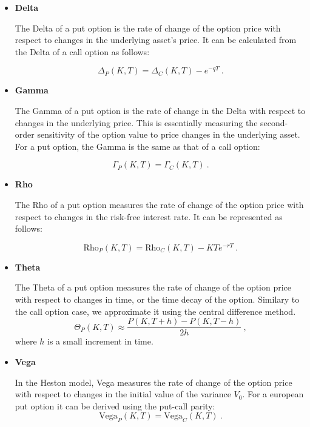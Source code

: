 \begin{itemize}

\item \textbf{Delta} 

The Delta of a put option is the rate of change of the option price with respect to changes in the underlying asset's price. It can be calculated from the Delta of a call option as follows:

$$
\Delta_P(K,T) = \Delta_C(K,T) - e^{-q T} \ .
$$


\item \textbf{Gamma} 

The Gamma of a put option is the rate of change in the Delta with respect to changes in the underlying price. This is essentially measuring the second-order sensitivity of the option value to price changes in the underlying asset. For a put option, the Gamma is the same as that of a call option:

$$
\Gamma_P(K,T) = \Gamma_C(K,T) \ .
$$



\item \textbf{Rho} 

The Rho of a put option measures the rate of change of the option price with respect to changes in the risk-free interest rate. It can be represented as follows:

$$
\text{Rho}_P(K,T) = \text{Rho}_C(K,T) - KTe^{-rT} \ .
$$



\item \textbf{Theta} 

The Theta of a put option measures the rate of change of the option price with respect to changes in time, or the time decay of the option. Similary to the call option case, we approximate it using the central difference method. 
$$
 \Theta_P(K,T) \approx \frac{P(K,T+h) - P(K,T-h)}{2h} \ ,
$$
where $h$ is a small increment in time. 


\item \textbf{Vega} 

In the Heston model, Vega measures the rate of change of the option price with respect to changes in the initial value of the variance $V_0$. For a european put option it can be derived using the put-call parity:
$$
\text{Vega}_P(K,T) = \text{Vega}_C(K,T) \ .
$$

\end{itemize}









